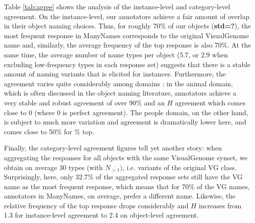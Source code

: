 Table \ref{tab:agree} shows the analysis of the instance-level and category-level agreement.
On the instance-level, our annotators achieve a fair amount of overlap in their object naming choices. 
Thus, for roughly 70\% of our objects (\textbf{std=?}), the most frequent response in ManyNames corresponds to the original VisualGenome name and, similarly, the average frequency of the top response is also 70\%. 
At the same time, the average number of name types per object (5.7, or 2.9 when excluding low-frequency types in each response set) suggests that there is a stable amount of naming variants that is elicited for instances. 
Furthermore, the agreement varies quite considerably among domains :  in the animal domain, which is often discussed in the object naming literature, annotators achieve a very stable and robust agreement of over 90\% and an $H$ agreement which comes close to 0 (where 0 is perfect agreement). 
The people domain, on the other hand, is subject to much more variation and agreement is dramatically lower here, and comes close to 50\% for \% top.



Finally, the category-level agreement figures tell yet another story: when aggregating the responses for all objects with the same VisualGenome synset, we obtain on average 30 types (with $N_{>1})$, i.e. variants of the original VG class. 
Surprisingly, here, only 32.7\% of the aggregated response sets still have the VG name as the most frequent response, which means that for 70\% of the VG names, annotators in ManyNames, on average, prefer a different name.  
Likewise, the relative frequency of the top response drops considerably and $H$ increases from 1.3 for instance-level agreement to 2.4 on object-level agreement.  
%
